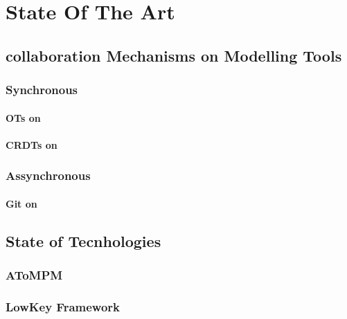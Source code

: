 

\chapter{State Of The Art}
\label{cha:state_of_the_art}

\section{}

\section{collaboration Mechanisms on Modelling Tools}

\subsection{Synchronous}

\subsubsection{OTs on}

\subsubsection{CRDTs on}

\subsection{Assynchronous}

\subsubsection{Git on}

\section{State of Tecnhologies}

\subsection{AToMPM}

\subsection{LowKey Framework}